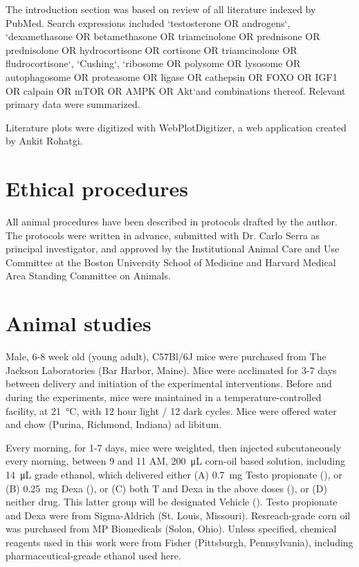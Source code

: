 \documentclass[12pt,english]{report}\usepackage[]{graphicx}\usepackage[]{color}
\begin{document}
The introduction section was based on review of all literature indexed
by PubMed. Search expressions included `testosterone OR androgens`,
`dexamethasone OR betamethasone OR triamcinolone OR prednisone OR
prednisolone OR hydrocortisone OR cortisone OR triamcinolone OR fludrocortisone`,
`Cushing`, `ribosome OR polysome OR lysosome OR autophagosome OR proteasome
OR ligase OR cathepsin OR FOXO OR IGF1 OR calpain OR mTOR OR AMPK
OR Akt`and combinations thereof. Relevant primary data were summarized.

Literature plots were digitized with WebPlotDigitizer, a web application
created by Ankit Rohatgi\citep{ankitrohatgi2015webplotdigitizer}.


\section{Ethical procedures}

All animal procedures have been described in protocols drafted by
the author. The protocols were written in advance, submitted with
Dr. Carlo Serra as principal investigator, and approved by the Institutional
Animal Care and Use Committee at the Boston University School of Medicine
and Harvard Medical Area Standing Committee on Animals.


\section{Animal studies}

Male, 6-8 week old (young adult), C57Bl/6J mice were purchased from
The Jackson Laboratories (Bar Harbor, Maine). Mice were acclimated
for 3-7 days between delivery and initiation of the experimental interventions.
Before and during the experiments, mice were maintained in a temperature-controlled
facility, at \SI{21}{\celsius}, with 12 hour light / 12 dark cycles.
Mice were offered water and chow (Purina, Richmond, Indiana) ad libitum.

Every morning, for 1-7 days, mice were weighted, then injected subcutaneously
every morning, between 9 and 11 AM, \SI{200}{\micro\liter} corn-oil
based solution, including \SI{14}{\micro\liter} grade ethanol, which
delivered either (A) \SI{0.7}{\milli\gram} Testo propionate (),
or (B) \SI{0.25}{\milli\gram} Dexa (),
or (C) both T and Dexa in the above doses (),
or (D) neither drug. This latter group will be designated Vehicle
(). Testo propionate and Dexa were
from Sigma-Aldrich (St. Louis, Missouri). Resreach-grade corn oil
was purchased from MP Biomedicals (Solon, Ohio). Unless specified,
chemical reagents used in this work were from Fisher (Pittsburgh,
Pennsylvania), including pharmaceutical-greade ethanol used here.
\end{document}
